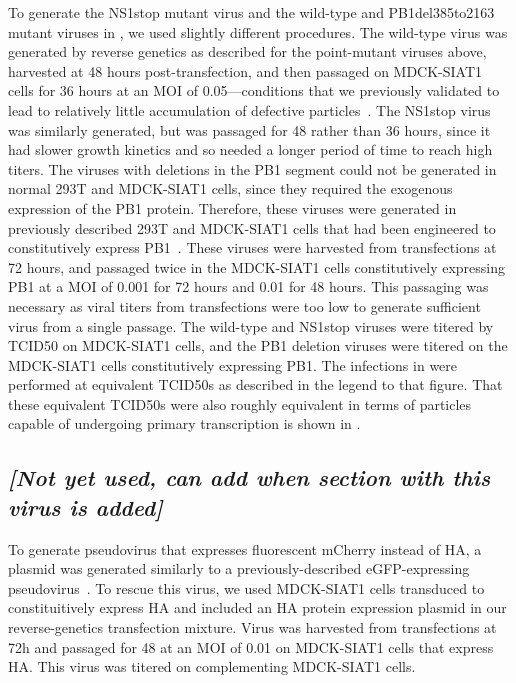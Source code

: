 \documentclass[9pt,lineno]{elife}
\newcommand{\jdbcomment}[1]{\emph{\color{red} [#1]}}
\begin{document}
To generate the NS1stop mutant virus and the wild-type and PB1del385to2163 mutant viruses in , we used slightly different procedures.
The wild-type virus was generated by reverse genetics as described for the point-mutant viruses above, harvested at 48 hours post-transfection, and then passaged on MDCK-SIAT1 cells for 36 hours at an MOI of 0.05---conditions that we previously validated to lead to relatively little accumulation of defective particles~\citep{russell2018extreme}.
The NS1stop virus was similarly generated, but was passaged for 48 rather than 36 hours, since it had slower growth kinetics and so needed a longer period of time to reach high titers.
The viruses with deletions in the PB1 segment could not be generated in normal 293T and MDCK-SIAT1 cells, since they required the exogenous expression of the PB1 protein.
Therefore, these viruses were generated in previously described 293T and MDCK-SIAT1 cells that had been engineered to constitutively express PB1~\citep{bloom2010permissive}.
These viruses were harvested from transfections at 72 hours, and passaged twice in the MDCK-SIAT1 cells constitutively expressing PB1 at a MOI of 0.001 for 72 hours and 0.01 for 48 hours. 
This passaging was necessary as viral titers from transfections were too low to generate sufficient virus from a single passage.
The wild-type and NS1stop viruses were titered by TCID50 on MDCK-SIAT1 cells, and the PB1 deletion viruses were titered on the MDCK-SIAT1 cells constitutively expressing PB1.
The infections in  were performed at equivalent TCID50s as described in the legend to that figure.
That these equivalent TCID50s were also roughly equivalent in terms of particles capable of undergoing primary transcription is shown in .

\subsection{\jdbcomment{Not yet used, can add when section with this virus is added}}
To generate pseudovirus that expresses fluorescent mCherry instead of HA, a plasmid was generated similarly to a previously-described eGFP-expressing pseudovirus~\citep{russell2018extreme}. 
To rescue this virus, we used MDCK-SIAT1 cells transduced to constituitively express HA and included an HA protein expression plasmid in our reverse-genetics transfection mixture.
Virus was harvested from transfections at 72h and passaged for 48 at an MOI of 0.01 on MDCK-SIAT1 cells that express HA. 
This virus was titered on complementing MDCK-SIAT1 cells.
\end{document}
